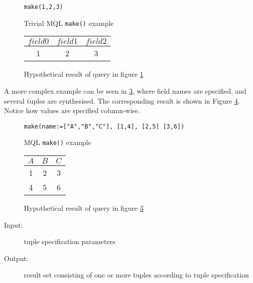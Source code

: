 \begin{figure}[!h]
\centering
\begin{Verbatim}
make(1,2,3)
\end{Verbatim}
\caption{Trivial MQL \texttt{make()} example}
\label{figure:mql:make_example1}
\end{figure}

\begin{figure}[!h]
\centering
\begin{tabular}{|c | c | c |}
\hline
$field0$ & $field1$ & $field2$ \\ \hline
1 & 2 & 3 \\ \hline
\end{tabular}
\caption{Hypothetical result of query in figure
\ref{figure:mql:make_example1}}
\label{figure:mql:make_example1_result}
\end{figure}

A more complex example can be seen in \ref{figure:mql:make_example2}, where
field names are specified, and several tuples are synthesised. The
corresponding result is shown in Figure \ref{figure:mql:make_example2_result}.
Notice how values are specified column-wise.

\begin{figure}[!h]
\centering
\begin{Verbatim}
make(name:=["A","B","C"], [1,4], [2,5] [3,6])
\end{Verbatim}
\caption{MQL \texttt{make()} example}
\label{figure:mql:make_example2}
\end{figure}

\begin{figure}[!h]
\centering
\begin{tabular}{|c | c | c |}
\hline
$A$ & $B$ & $C$ \\ \hline
1 & 2 & 3 \\ \hline
4 & 5 & 6 \\ \hline
\end{tabular}
\caption{Hypothetical result of query in figure
\ref{figure:mql:make_example2}}
\label{figure:mql:make_example2_result}
\end{figure}

\begin{description}
  \item[Input:] tuple specification parameters
  \item[Output:] result set consisting of one or more tuples according to tuple
  specification
\end{description}

